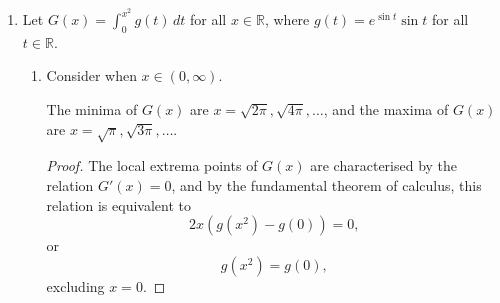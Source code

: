 \begin{enumerate}
\begin{enumerate}
\begin{enumerate}
                        \bigskip

                    \item Note that $H'(x)$ is always zero, however $h(x)$ is non-zero for rational values of $x$. This means that the equation $H'(x) = h(x)$ is false for all $x \in \mathbb{Q}$.

                        This does not violate the fundamental theorem of calculus, however, because the theorem requires that $h$ be continuous \parencite{fundamental-theorem-of-calculus}.
                        We have found in the proof of \cref{prop:1di} that $h$ is continuous almost everywhere on $[0, 1]$, but is not necessarily continuous, hence the fundamental theorem of calculus does not apply.
                \end{enumerate}

        \end{enumerate}

        \bigskip

    \item Let $G(x) = \int_0^{x^2} g(t) \, dt$ for all $x \in \mathbb{R}$, where $g(t) = e^{\sin t} \sin t$ for all $t \in \mathbb{R}$.

        \bigskip

        \begin{enumerate}

            \item Consider when $x \in (0, \infty)$.

                \medskip

                \begin{proposition}
                    \setlength{\baselineskip}{20pt}
                    The minima of $G(x)$ are $x = \sqrt{2 \pi}, \sqrt{4 \pi}, \ldots$, and the maxima of $G(x)$ are $x = \sqrt{\pi}, \sqrt{3 \pi}, \ldots$.
                \end{proposition}

                \smallskip

                \begin{proof}
                    The local extrema points of $G(x)$ are characterised by the relation $G'(x) = 0$, and by the fundamental theorem of calculus, this relation is equivalent to
                    \[ 2 x \left(g(x^2) - g(0)\right) = 0, \]
                    or
                    \[ g(x^2) = g(0), \]
                    excluding $x = 0$.


\end{proof}
\end{enumerate}
\end{enumerate}
